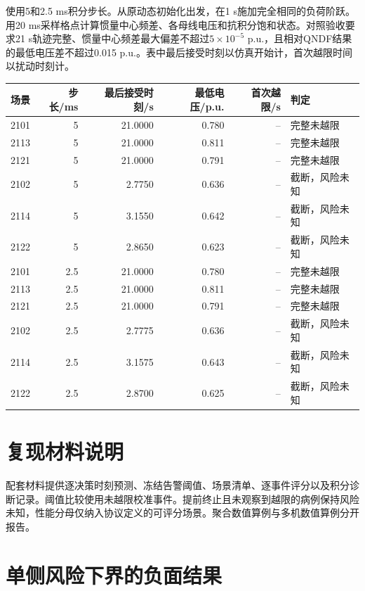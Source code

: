 \documentclass[UTF8,a4paper,11pt]{ctexart}
\begin{document}
使用5和2.5 ms积分步长。从原动态初始化出发，在1 s施加完全相同的负荷阶跃。用20 ms采样格点计算惯量中心频差、各母线电压和抗积分饱和状态。对照验收要求21 s轨迹完整、惯量中心频差最大偏差不超过$5\times10^{-5}$ p.u.，且相对QNDF结果的最低电压差不超过0.015 p.u.。表中最后接受时刻以仿真开始计，首次越限时间以扰动时刻计。

\begin{center}
\small
{}
\begin{tabular}{rrrrrl}
\toprule
场景 & 步长/ms & 最后接受时刻/s & 最低电压/p.u. & 首次越限/s & 判定\\
\midrule
2101 & 5 & 21.0000 & 0.780 & -- & 完整未越限 \\
2113 & 5 & 21.0000 & 0.811 & -- & 完整未越限 \\
2121 & 5 & 21.0000 & 0.791 & -- & 完整未越限 \\
2102 & 5 & 2.7750 & 0.636 & -- & 截断，风险未知 \\
2114 & 5 & 3.1550 & 0.642 & -- & 截断，风险未知 \\
2122 & 5 & 2.8650 & 0.623 & -- & 截断，风险未知 \\
2101 & 2.5 & 21.0000 & 0.780 & -- & 完整未越限 \\
2113 & 2.5 & 21.0000 & 0.811 & -- & 完整未越限 \\
2121 & 2.5 & 21.0000 & 0.791 & -- & 完整未越限 \\
2102 & 2.5 & 2.7775 & 0.636 & -- & 截断，风险未知 \\
2114 & 2.5 & 3.1575 & 0.643 & -- & 截断，风险未知 \\
2122 & 2.5 & 2.8700 & 0.625 & -- & 截断，风险未知 \\
\bottomrule
\end{tabular}
\end{center}


\section{复现材料说明}
配套材料提供逐决策时刻预测、冻结告警阈值、场景清单、逐事件评分以及积分诊断记录。阈值比较使用未越限校准事件。提前终止且未观察到越限的病例保持风险未知，性能分母仅纳入协议定义的可评分场景。聚合数值算例与多机数值算例分开报告。

\section{单侧风险下界的负面结果}\label{sec:risk-fail}
\end{document}
